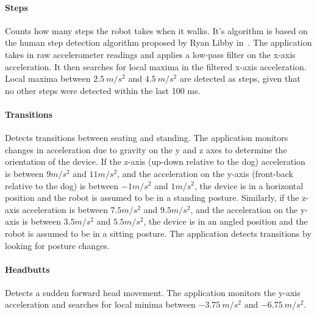 \paragraph{Steps} Counts how many steps the robot takes when it
  walks. It's algorithm is based on the human step detection algorithm
  proposed by Ryan Libby in~\cite{libbyFootstepDetection}. The
  application takes in raw accelerometer readings and applies a
  low-pass filter on the x-axis acceleration. It then searches for
  local maxima in the filtered x-axis acceleration. Local maxima
  between $2.5\:m/s^2$ and $4.5\:m/s^2$ are detected as steps, given
  that no other steps were detected within the last 100 ms.

\paragraph{Transitions} Detects transitions between seating and
  standing.  The application monitors changes in acceleration due to
  gravity on the y and z axes to determine the orientation of the
  device. If the z-axis (up-down relative to the dog) acceleration is
  between $9 m/s^2$ and $11 m/s^2$, and the acceleration on the y-axis
  (front-back relative to the dog) is between $-1 m/s^2$ and $1
  m/s^2$, the device is in a horizontal position and the robot is
  assumed to be in a standing posture. Similarly, if the z-axis
  acceleration is between $7.5 m/s^2$ and $9.5 m/s^2$, and the
  acceleration on the y-axis is between $3.5 m/s^2$ and $5.5 m/s^2$,
  the device is in an angled position and the robot is assumed to be
  in a sitting posture. The application detects transitions by looking
  for posture changes.

\paragraph{Headbutts} Detects a sudden forward head movement.  The
  application monitors the y-axis acceleration and searches for local
  minima between $-3.75\:m/s^2$ and $-6.75\:m/s^2$.
